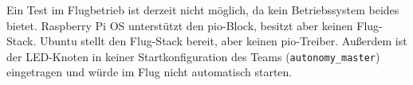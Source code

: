            Ein Test im Flugbetrieb ist derzeit nicht möglich, da kein Betriebssystem beides bietet. Raspberry Pi OS unterstützt den \gls{pio}-Block, besitzt aber keinen Flug-Stack. Ubuntu stellt den Flug-Stack bereit, aber keinen \gls{pio}-Treiber. Außerdem ist der LED-Knoten in keiner Startkonfiguration des Teams (\texttt{autonomy\_master}) eingetragen und würde im Flug nicht automatisch starten.
